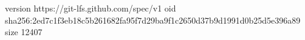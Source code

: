 version https://git-lfs.github.com/spec/v1
oid sha256:2ed7c1f3eb18c5b261682fa95f7d29ba9f1c2650d37b9d1991d0b25d5e396a89
size 12407
